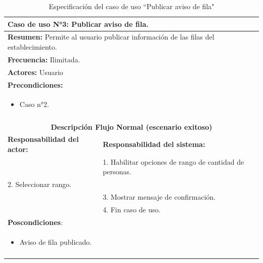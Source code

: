 \begin{table}[H]
    \centering
    \caption{Especificaci\'on del caso de uso ``Publicar aviso de fila"}
    \begin{tabularx}{\textwidth}{|X|X|}
        \hline
        \multicolumn{2}{|l|}{\textbf{Caso de uso N°3:} Publicar aviso de fila.}\\\hline
        \multicolumn{2}{|l|}{\textbf{Resumen:} Permite al usuario publicar información de las filas del establecimiento.}\\\hline
        \multicolumn{2}{|l|}{\textbf{Frecuencia:} Ilimitada.}\\\hline
        \multicolumn{2}{|l|}{\textbf{Actores:} Usuario}\\\hline
        \multicolumn{2}{|l|}{\textbf{Precondiciones:}}\\
        \multicolumn{2}{|l|}{\begin{minipage}[t]{0,8\textwidth}
        \begin{itemize}
            \item Caso n°2.
        \end{itemize}
        \end{minipage}}\\
        \multicolumn{2}{|l|}{}\\\hline  
        \multicolumn{2}{|c|}{\textbf{Descripci\'on Flujo Normal (escenario exitoso)}}\\\hline
        \textbf{Responsabilidad del actor:} & \textbf{Responsabilidad del sistema:}\\ \hline
        &1. Habilitar opciones de rango de cantidad de personas.\\
        2. Seleccionar rango.&\\
        &3. Mostrar mensaje de confirmación.\\
        &4. Fin caso de uso.\\\hline
        \multicolumn{2}{|l|}{\textbf{Poscondiciones}:}\\
        \multicolumn{2}{|l|}{\begin{minipage}[t]{0,8\textwidth}
        \begin{itemize}
            \item Aviso de fila publicado.
        \end{itemize}
        \end{minipage}}\\
        \multicolumn{2}{|l|}{}\\\hline  
    \end{tabularx}
    \label{usecase3}
\end{table}

